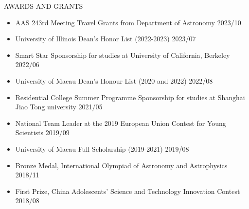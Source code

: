 \documentclass[10pt]{article} %
\begin{document}
\begin{section}{AWARDS AND GRANTS}

    \begin{itemize}[leftmargin=1.5em]
        \item AAS 243rd Meeting Travel Grants from Department of Astronomy \hfill 2023/10
        \item University of Illinois Dean's Honor List (2022-2023) \hfill 2023/07
        \item Smart Star Sponsorship for studies at University of California, Berkeley \hfill 2022/06
        \item University of Macau Dean's Honour List (2020 and 2022) \hfill 2022/08
        \item Residential College Summer Programme Sponsorship for studies at Shanghai Jiao Tong university \hfill 2021/05
        \item National Team Leader at the 2019 European Union Contest for Young Scientists \hfill 2019/09
        \item University of Macau Full Scholarship (2019-2021) \hfill 2019/08
        \item Bronze Medal, International Olympiad of Astronomy and Astrophysics \hfill 2018/11
        \item First Prize, China Adolescents' Science and Technology Innovation Contest \hfill 2018/08
    \end{itemize}
        
\end{section}
\end{document}
